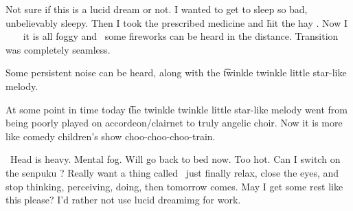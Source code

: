 Not sure if this is a lucid dream or not.  I wanted to get to sleep so bad, unbelievably sleepy. Then I took the prescribed medicine and \f{hit the hay} . Now I \hatr\  \emdash\ \hatb\ it is all foggy  and \haty\ some fireworks can be heard in the distance. Transition  was completely seamless.

Some persistent noise can be heard, along with the \t{twinkle twinkle little star}-like melody.

At some point in time today \t{the twinkle twinkle little star-like melody} went from being poorly played on accordeon/clairnet to truly angelic choir. Now it is more like comedy children's show choo-choo-choo-train.

\hatb\ Head is heavy. Mental fog. Will go back to bed now. Too hot. Can I switch on the senpuku ? Really want a thing called  \emdash\ just finally relax, close the eyes, and stop thinking, perceiving, doing, then tomorrow comes. May I get some rest like this please? I'd rather not use lucid dreamimg for work.
